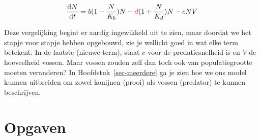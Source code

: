 \documentclass[
  a4paper,
]{scrbook}
\theoremstyle{definition}
\theoremstyle{remark}
\begin{document}
\begin{align}
    \frac{\mathrm{d}N}{\mathrm{d}t} &= \color{blue}b\color{black}(1-\frac{N}{K_b})N - \color{red}d\color{black}(1+\frac{N}{K_d})N - cNV\\
\end{align}

Deze vergelijking begint er aardig ingewikkeld uit te zien, maar doordat
we het stapje voor stapje hebben opgebouwd, zie je wellicht goed in wat
elke term betekent. In de laatste (nieuwe term), staat \(c\) voor de
predatiesnelheid is en \(V\) de hoeveelheid vossen. Maar vossen zouden
zelf dan toch ook van populatiegrootte moeten veranderen? In
Hoofdstuk~\ref{sec-meerdere} ga je zien hoe we ons model kunnen
uitbreiden om zowel konijnen (prooi) als vossen (predator) te kunnen
beschrijven.

\section{Opgaven}\label{opgaven-5}
\end{document}
